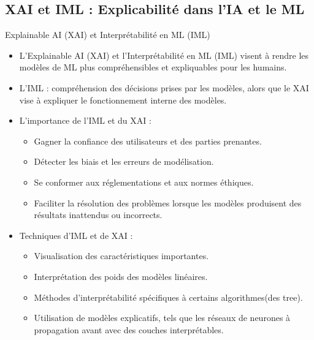 \documentclass{beamer}
\begin{document}
\subsection{XAI et IML : Explicabilité dans l'IA et le ML}	
\begin{frame}{Explainable AI (XAI) et Interprétabilité en ML (IML)}
	\begin{itemize}
		\item L'Explainable AI (XAI) et l'Interprétabilité en ML (IML) visent à rendre les modèles de ML plus compréhensibles et expliquables pour les humains.
		\item L'IML : compréhension des décisions prises par les modèles, alors que le XAI vise à expliquer le fonctionnement interne des modèles.
		\item L'importance de l'IML et du XAI :
		\begin{itemize}
			\item Gagner la confiance des utilisateurs et des parties prenantes.
			\item Détecter les biais et les erreurs de modélisation.
			\item Se conformer aux réglementations et aux normes éthiques.
			\item Faciliter la résolution des problèmes lorsque les modèles produisent des résultats inattendus ou incorrects.
		\end{itemize}
		\item Techniques d'IML et de XAI :
		\begin{itemize}
			\item Visualisation des caractéristiques importantes.
			\item Interprétation des poids des modèles linéaires.
			\item Méthodes d'interprétabilité spécifiques à certains algorithmes(des tree).
			\item Utilisation de modèles explicatifs, tels que les réseaux de neurones à propagation avant avec des couches interprétables.
		\end{itemize}
	\end{itemize}
\end{frame}
	
\end{document}
